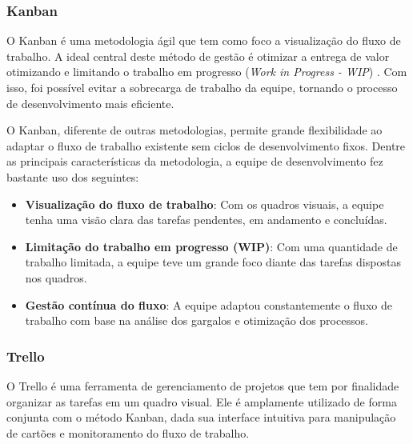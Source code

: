 \subsubsection{Kanban}
O Kanban é uma metodologia ágil que tem como foco a visualização do fluxo de trabalho. A ideal central deste método de gestão é otimizar a entrega de valor otimizando e limitando o trabalho em progresso (\textit{Work in Progress - WIP}) \cite{kanban2025}. Com isso, foi possível evitar a sobrecarga de trabalho da equipe, tornando o processo de desenvolvimento mais eficiente.

O Kanban, diferente de outras metodologias, permite grande flexibilidade ao adaptar o fluxo de trabalho existente sem ciclos de desenvolvimento fixos. Dentre as principais características da metodologia, a equipe de desenvolvimento fez bastante uso dos seguintes:

\begin{itemize}
    \item \textbf{Visualização do fluxo de trabalho}: Com os quadros visuais, a equipe tenha uma visão clara das tarefas pendentes, em andamento e concluídas.
    \item \textbf{Limitação do trabalho em progresso (WIP)}: Com uma quantidade de trabalho limitada, a equipe teve um grande foco diante das tarefas dispostas nos quadros.
    \item \textbf{Gestão contínua do fluxo}: A equipe adaptou constantemente o fluxo de trabalho com base na análise dos gargalos e otimização dos processos.
\end{itemize}

\subsubsection{Trello}
O Trello é uma ferramenta de gerenciamento de projetos que tem por finalidade organizar as tarefas em um quadro visual. Ele é amplamente utilizado de forma conjunta com o método Kanban, dada sua interface intuitiva para manipulação de cartões e monitoramento do fluxo de trabalho.

